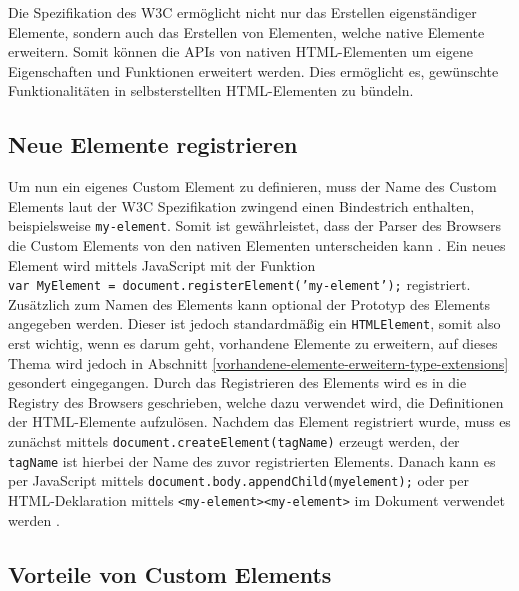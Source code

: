 

Die Spezifikation des \ac{W3C} ermöglicht nicht nur das Erstellen eigenständiger Elemente, sondern auch das Erstellen von Elementen, welche native Elemente erweitern. Somit können die \ac{API}s von nativen \ac{HTML}-Elementen um eigene Eigenschaften und Funktionen erweitert werden. Dies ermöglicht es, gewünschte Funktionalitäten in selbsterstellten \ac{HTML}-Elementen zu bündeln.


\subsection{Neue Elemente registrieren}\label{neue-elemente-registrieren}

Um nun ein eigenes Custom Element zu definieren, muss der Name des Custom Elements laut der \ac{W3C} Spezifikation zwingend einen Bindestrich enthalten, beispielsweise \texttt{my-element}. Somit ist gewährleistet, dass der Parser des Browsers die Custom Elements von den nativen Elementen unterscheiden kann \cite{citeulike:13845061}. Ein neues Element wird mittels JavaScript mit der Funktion \texttt{var\ MyElement\ =\ document.registerElement('my-element');} registriert. Zusätzlich zum Namen des Elements kann optional der Prototyp des Elements angegeben werden. Dieser ist jedoch standardmäßig ein \texttt{HTMLElement}, somit also erst wichtig, wenn es darum geht, vorhandene Elemente zu erweitern, auf dieses Thema wird jedoch in Abschnitt \ref{vorhandene-elemente-erweitern-type-extensions} gesondert eingegangen. Durch das Registrieren des Elements wird es in die Registry des Browsers geschrieben, welche dazu verwendet wird, die Definitionen der \ac{HTML}-Elemente aufzulösen. Nachdem das Element registriert wurde, muss es zunächst mittels \texttt{document.createElement(tagName)} erzeugt werden, der \texttt{tagName} ist hierbei der Name des zuvor registrierten Elements. Danach kann es per JavaScript mittels \texttt{document.body.appendChild(myelement);} oder per \ac{HTML}-Deklaration mittels \texttt{\textless{}my-element\textgreater{}\textless{}my-element\textgreater{}} im Dokument verwendet werden \cite[S. 127-138]{citeulike:13844975}.


\subsection{Vorteile von Custom Elements}\label{vorteile-von-custom-elements}

